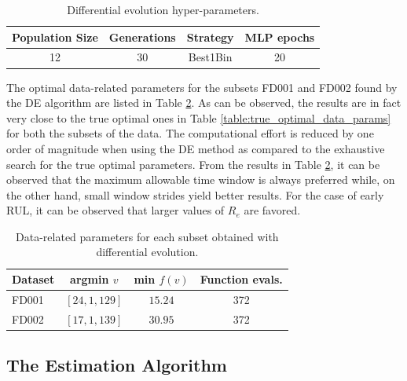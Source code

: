 \documentclass[preprint,12pt]{elsarticle}%
\begin{document}
\begin{table}[!htb]
\begin{center}
\begin{tabular}[c]{llll}\hline
Population Size & Generations & Strategy & MLP epochs\\\hline
\multicolumn{1}{c}{12} & \multicolumn{1}{c}{30} & \multicolumn{1}{c}{Best1Bin \cite{Engelbrecht2007}}
& \multicolumn{1}{c}{20}\\\hline
\end{tabular}
\caption{Differential evolution hyper-parameters.}
\label{table:de_hyperparams}
\end{center}
\end{table}

The optimal data-related parameters for the subsets FD001 and FD002 found by
the DE algorithm are listed in Table \ref{table:optimal_data_params}. As can be
observed, the results are in fact very close to the true optimal ones 
in Table \ref{table:true_optimal_data_params} for both the subsets of the
data. The computational effort is reduced by one order of magnitude when using
the DE method as compared to the exhaustive search for the true optimal
parameters. From the results in Table \ref{table:optimal_data_params}, it can
be observed that the maximum allowable time window is always preferred while,
on the other hand, small window strides yield better results. For the case of
early RUL, it can be observed that larger values of $R_{e}$ are favored.

\begin{table}[!htb]
\begin{center}
\begin{tabular}[c]{l|crr}\hline
Dataset & argmin $v$ & min $f(v)$ & Function evals.\\\hline
FD001 & $\left[  24,1,129\right]  $ & \multicolumn{1}{c}{$15.24$} & \multicolumn{1}{c}{372}\\
FD002 & $\left[  17,1,139\right]  $ & \multicolumn{1}{c}{$30.95$} & \multicolumn{1}{c}{372}\\\hline
\end{tabular}
\caption{Data-related parameters for each subset obtained with differential evolution.}
\label{table:optimal_data_params}
\end{center}
\end{table}

\pagebreak

\subsection{The Estimation Algorithm}
\end{document}
